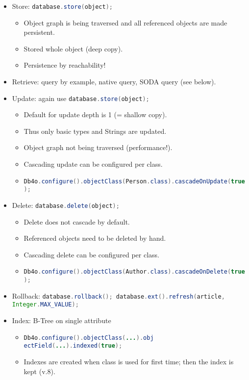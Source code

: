 \begin{breakbox}
\end{breakbox}

\begin{breakbox}
\begin{itemize}
	\item Store: \lstinline[language=Java]{database.store(object);}
		\begin{itemize}
			\item Object graph is being traversed and all referenced objects are made persistent.
			\item Stored whole object (deep copy).
			\item Persistence by reachability!
		\end{itemize}
	\item Retrieve: query by example, native query, SODA query (see below).
	\item Update: again use \lstinline[language=Java]{database.store(object);}
		\begin{itemize}
			\item Default for update depth is 1 (= shallow copy).
			\item Thus only basic types and Strings are updated.
			\item Object graph not being traversed (performance!).
			\item Cascading update can be configured per class.
			\item \lstinline[language=Java]{Db4o.configure().objectClass(Person.class).cascadeOnUpdate(true);}
		\end{itemize}
	\item Delete: \lstinline[language=Java]{database.delete(object);}
		\begin{itemize}
			\item Delete does not cascade by default.
			\item Referenced objects need to be deleted by hand.
			\item Cascading delete can be configured per class.
			\item \lstinline[language=Java]{Db4o.configure().objectClass(Author.class).cascadeOnDelete(true);}
		\end{itemize}
	\item Rollback: \lstinline[language=Java]{database.rollback(); database.ext().refresh(article, Integer.MAX_VALUE);}
	\item Index: B-Tree on single attribute
		\begin{itemize}
			\item \lstinline[language=Java]{Db4o.configure().objectClass(...).obj ectField(...).indexed(true);}
			\item Indexes are created when class is used for first time; then the index is kept (v.8).
		\end{itemize}
\end{itemize}
\end{breakbox}

